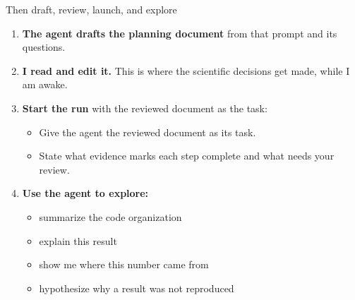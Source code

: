 \begin{frame}{Then draft, review, launch, and explore}
  \vspace{-0.4cm}
  \begin{enumerate}\setlength\itemsep{0.5em}
    \item \textbf{The agent drafts the planning document} from that prompt and its questions.
    \item \textbf{I read and edit it.} This is where the scientific decisions get made, while I am awake.
    \item \textbf{Start the run} with the reviewed document as the task:
      \begin{itemize}\small\setlength\itemsep{0.2em}
        \item Give the agent the reviewed document as its task.
        \item State what evidence marks each step complete and what needs your review.
      \end{itemize}
    \item \textbf{Use the agent to explore:}
      \begin{itemize}\small\setlength\itemsep{0.2em}
        \item summarize the code organization
        \item explain this result
        \item show me where this number came from
        \item hypothesize why a result was not reproduced
      \end{itemize}
  \end{enumerate}
  \vspace{1.1cm plus 1fill}
\end{frame}
